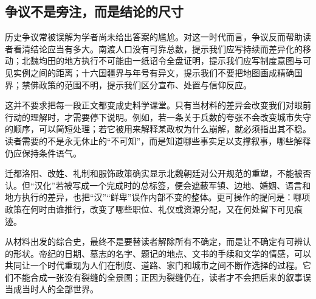 \subsection{争议不是旁注，而是结论的尺寸}

历史争议常被误解为学者尚未给出答案的尴尬。对这一时代而言，争议反而帮助读者看清结论应当有多大。南渡人口没有可靠总数，提示我们应写持续而差异化的移动；北魏均田的地方执行不可能由一纸诏令全盘证明，提示我们应写制度意图与可见实例之间的距离；十六国疆界与年号有异文，提示我们不要把地图画成精确国界；禁佛政策的范围不明，提示我们区分宣布、处置与信仰反应。

这并不要求把每一段正文都变成史料学课堂。只有当材料的差异会改变我们对眼前行动的理解时，才需要停下说明。例如，若一条关于兵数的夸张不会改变城市失守的顺序，可以简短处理；若它被用来解释某政权为什么崩解，就必须指出其不稳。读者需要的不是永无休止的“不可知”，而是知道哪些事实足以支撑叙事，哪些解释仍应保持条件语气。

\begin{debate}[“汉化”能概括北魏吗]
迁都洛阳、改姓、礼制和服饰政策确实显示北魏朝廷对公开规范的重塑，不能被否认。但“汉化”若被写成一个完成时的总标签，便会遮蔽军镇、边地、婚姻、语言和地方执行的差异，也把“汉”“鲜卑”误作内部不变的整体。更可操作的提问是：哪项政策在何时由谁推行，改变了哪些职位、礼仪或资源分配，又在何处留下可见痕迹。
\end{debate}

从材料出发的综合史，最终不是要替读者解除所有不确定，而是让不确定有可辨认的形状。帝纪的日期、墓志的名字、题记的地点、文书的手续和文学的情感，可以共同让一个时代重现为人们在制度、道路、家门和城市之间不断作选择的过程。它们不能合成一张没有裂缝的全景图；正因为裂缝仍在，读者才不会把后来的叙事误当成当时人的全部世界。
